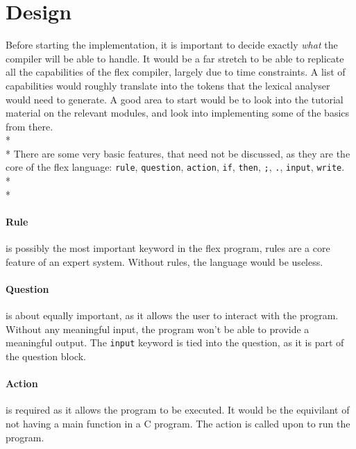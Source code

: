 \documentclass[12pt]{report}
\begin{document}
\section{Design}\label{sec:design}
Before starting the implementation, it is important to decide exactly \textit{what} the compiler will be able to handle.  It would be a far stretch to be able to replicate all the capabilities of the flex compiler, largely due to time constraints.  A list of capabilities would roughly translate into the tokens that the lexical analyser would need to generate.  A good area to start would be to look into the tutorial material on the relevant modules, and look into implementing some of the basics from there.\\*
\\*
There are some very basic features, that need not be discussed, as they are the core of the flex language: \texttt{rule}, \texttt{question}, \texttt{action}, \texttt{if}, \texttt{then}, \texttt{;}, \texttt{.}, \texttt{input}, \texttt{write}.\\*
\\*
\paragraph{Rule} is possibly the most important keyword in the flex program, rules are a core feature of an expert system.  Without rules, the language would be useless.
\paragraph{Question} is about equally important, as it allows the user to interact with the program.  Without any meaningful input, the program won't be able to provide a meaningful output.  The \texttt{input} keyword is tied into the question, as it is part of the question block.
\paragraph{Action} is required as it allows the program to be executed.  It would be the equivilant of not having a main function in a C program.  The action is called upon to run the program.
\end{document}
